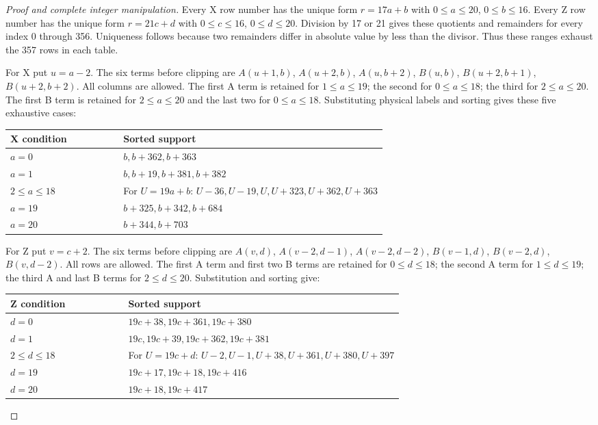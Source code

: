 \documentclass{article}
\begin{document}
\begin{proof}[Proof and complete integer manipulation]
  Every X row number has the unique form \(r = 17a + b\) with \(0 \le a \le 20\),
  \(0 \le b \le 16\). Every Z row number has the unique form \(r = 21c + d\) with
  \(0 \le c \le 16\), \(0 \le d \le 20\). Division by 17 or 21 gives these quotients and
  remainders for every index 0 through 356. Uniqueness follows because two remainders differ in
  absolute value by less than the divisor. Thus these ranges exhaust the 357 rows in each table.

  For X put \(u = a - 2\). The six terms before clipping are \(A(u+1,b)\), \(A(u+2,b)\),
  \(A(u,b+2)\), \(B(u,b)\), \(B(u+2,b+1)\), \(B(u+2,b+2)\). All columns are allowed. The first A
  term is retained for \(1 \le a \le 19\); the second for \(0 \le a \le 18\); the third for
  \(2 \le a \le 20\). The first B term is retained for \(2 \le a \le 20\) and the last two for
  \(0 \le a \le 18\). Substituting physical labels and sorting gives these five exhaustive cases:
  \begin{center}
    \begin{tabular}{lp{0.7\linewidth}}
      X condition & Sorted support \\
      \hline
      \(a = 0\) & \(b, b + 362, b + 363\) \\
      \(a = 1\) & \(b, b + 19, b + 381, b + 382\) \\
      \(2 \le a \le 18\) & For \(U = 19a + b\): \(U - 36, U - 19, U, U + 323, U + 362, U + 363\) \\
      \(a = 19\) & \(b + 325, b + 342, b + 684\) \\
      \(a = 20\) & \(b + 344, b + 703\) \\
    \end{tabular}
  \end{center}

  For Z put \(v = c + 2\). The six terms before clipping are \(A(v,d)\), \(A(v-2,d-1)\),
  \(A(v-2,d-2)\), \(B(v-1,d)\), \(B(v-2,d)\), \(B(v,d-2)\). All rows are allowed. The first A
  term and first two B terms are retained for \(0 \le d \le 18\); the second A term for
  \(1 \le d \le 19\); the third A and last B terms for \(2 \le d \le 20\). Substitution and
  sorting give:
  \begin{center}
    \begin{tabular}{lp{0.7\linewidth}}
      Z condition & Sorted support \\
      \hline
      \(d = 0\) & \(19c + 38, 19c + 361, 19c + 380\) \\
      \(d = 1\) & \(19c, 19c + 39, 19c + 362, 19c + 381\) \\
      \(2 \le d \le 18\) & For \(U = 19c + d\): \(U - 2, U - 1, U + 38, U + 361, U + 380, U + 397\) \\
      \(d = 19\) & \(19c + 17, 19c + 18, 19c + 416\) \\
      \(d = 20\) & \(19c + 18, 19c + 417\) \\
    \end{tabular}
  \end{center}


\end{proof}
\end{document}
